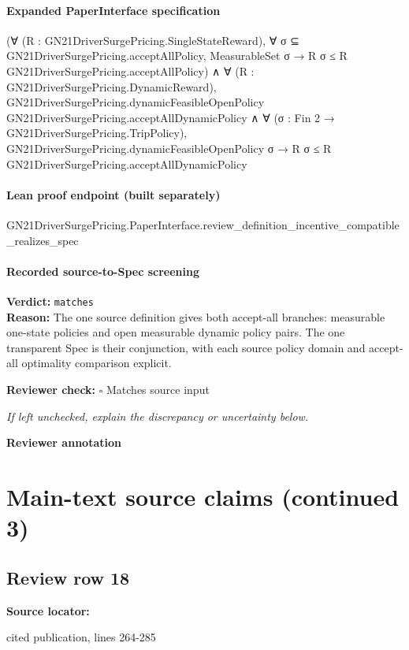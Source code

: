 \documentclass[10pt]{article}
\newcommand{\reviewerbox}{%
  \par\noindent\fbox{\parbox{0.96\linewidth}{\rule{0pt}{0.38in}}}\par
}
\newcommand{\reviewmatch}[1]{%
  \par\noindent\textbf{Reviewer check:} $\square$\; #1\par
  \noindent\emph{If left unchecked, explain the discrepancy or uncertainty below.}\par
}
\begin{document}
\paragraph{Expanded PaperInterface specification}
\begin{ReviewVerbatim}
(∀ (R : GN21DriverSurgePricing.SingleStateReward),
    ∀ σ ⊆ GN21DriverSurgePricing.acceptAllPolicy, MeasurableSet σ → R σ ≤ R GN21DriverSurgePricing.acceptAllPolicy) ∧
  ∀ (R : GN21DriverSurgePricing.DynamicReward),
    GN21DriverSurgePricing.dynamicFeasibleOpenPolicy GN21DriverSurgePricing.acceptAllDynamicPolicy ∧
      ∀ (σ : Fin 2 → GN21DriverSurgePricing.TripPolicy),
        GN21DriverSurgePricing.dynamicFeasibleOpenPolicy σ → R σ ≤ R GN21DriverSurgePricing.acceptAllDynamicPolicy
\end{ReviewVerbatim}

\paragraph{Lean proof endpoint (built separately)}\begin{ReviewVerbatim}
GN21DriverSurgePricing.PaperInterface.review_definition_incentive_compatible_realizes_spec
\end{ReviewVerbatim}

\paragraph{Recorded source-to-Spec screening}
\textbf{Verdict:} \texttt{matches}
\\
\textbf{Reason:} The one source definition gives both accept-all branches: measurable one-state policies and open measurable dynamic policy pairs. The one transparent Spec is their conjunction, with each source policy domain and accept-all optimality comparison explicit.
\reviewmatch{Matches source input}
\noindent\textbf{Reviewer annotation}\par
\reviewerbox
\clearpage
\hypertarget{source-claim-f1c3806503822cde}{}
\hypertarget{source-section-6c491f2461bc0518}{}
\section*{Main-text source claims (continued 3)}
\subsection*{Review row 18}
\textbf{Source locator:} {\footnotesize\raggedright cited publication, lines 264-\allowbreak{}285\par}
\end{document}
